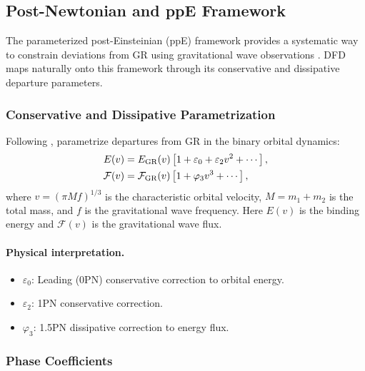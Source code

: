 \subsection{Post-Newtonian and ppE Framework}\label{sec:gw-ppe}

The parameterized post-Einsteinian (ppE) framework provides a systematic way to constrain deviations from GR using gravitational wave observations \cite{Yunes2009}. DFD maps naturally onto this framework through its conservative and dissipative departure parameters.

\subsubsection{Conservative and Dissipative Parametrization}\label{sec:gw-ppe-param}

Following \cite{Yunes2009}, parametrize departures from GR in the binary orbital dynamics:
\begin{align}
E(v) &= E_{\rm GR}(v)\left[1 + \varepsilon_0 + \varepsilon_2 v^2 + \cdots\right], \label{eq:ppe-energy}\\
\mathcal{F}(v) &= \mathcal{F}_{\rm GR}(v)\left[1 + \varphi_3 v^3 + \cdots\right], \label{eq:ppe-flux}
\end{align}
where $v = (\pi M f)^{1/3}$ is the characteristic orbital velocity, $M = m_1 + m_2$ is the total mass, and $f$ is the gravitational wave frequency. Here $E(v)$ is the binding energy and $\mathcal{F}(v)$ is the gravitational wave flux.

\paragraph{Physical interpretation.}
\begin{itemize}
\item $\varepsilon_0$: Leading (0PN) conservative correction to orbital energy.
\item $\varepsilon_2$: 1PN conservative correction.
\item $\varphi_3$: 1.5PN dissipative correction to energy flux.
\end{itemize}

\subsubsection{Phase Coefficients}\label{sec:gw-ppe-phase}

